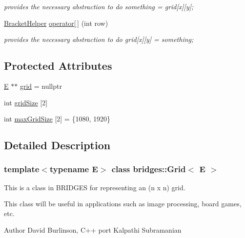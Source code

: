 \begin{DoxyCompactItemize}
\begin{DoxyCompactList}\small\item\em provides the necessary abstraction to do something = grid\mbox{[}x\mbox{]}\mbox{[}y\mbox{]}; \end{DoxyCompactList}\item 
\mbox{\hyperlink{classbridges_1_1_grid_1_1_bracket_helper}{Bracket\+Helper}} \mbox{\hyperlink{classbridges_1_1_grid_ae7abc13b8aebe96372b05013a993c33b}{operator\mbox{[}$\,$\mbox{]}}} (int row)
\begin{DoxyCompactList}\small\item\em provides the necessary abstraction to do grid\mbox{[}x\mbox{]}\mbox{[}y\mbox{]} = something; \end{DoxyCompactList}\end{DoxyCompactItemize}
\subsection*{Protected Attributes}
\begin{DoxyCompactItemize}
\item 
\mbox{\hyperlink{namespacebridges_acfb0a4f7877d8f63de3e6862004c50eda3a3ea00cfc35332cedf6e5e9a32e94da}{E}} $\ast$$\ast$ \mbox{\hyperlink{classbridges_1_1_grid_aea6c38498d477f09dc03906ee6fb6e19}{grid}} = nullptr
\item 
int \mbox{\hyperlink{classbridges_1_1_grid_af7c3a077b54e3346621e54276c1fa13e}{grid\+Size}} \mbox{[}2\mbox{]}
\item 
int \mbox{\hyperlink{classbridges_1_1_grid_a800909a94e0affac82da79cf3e6d03e5}{max\+Grid\+Size}} \mbox{[}2\mbox{]} = \{1080, 1920\}
\end{DoxyCompactItemize}


\subsection{Detailed Description}
\subsubsection*{template$<$typename E$>$\newline
class bridges\+::\+Grid$<$ E $>$}

This is a class in B\+R\+I\+D\+G\+ES for representing an (n x n) grid. 

This class will be useful in applications such as image processing, board games, etc.

\begin{DoxyAuthor}{Author}
David Burlinson, C++ port Kalpathi Subramanian
\end{DoxyAuthor}

